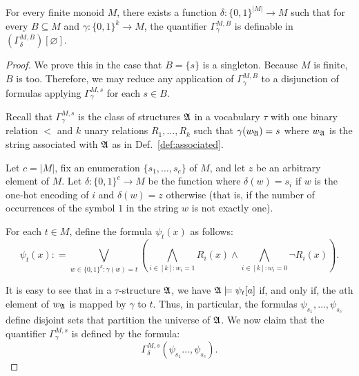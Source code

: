 \documentclass[a4paper,UKenglish,cleveref, autoref, thm-restate, anonymous]{lipics-v2021}
\begin{document}
\begin{lemma}\label{lem:finitetuple}
    For every finite monoid $M$, there exists a function $\delta : \{0,1\}^{|M|} \rightarrow M$ such that for every $B \subseteq M$ and $\gamma : \{0,1\}^k \rightarrow M$, the quantifier $\Gamma^{M,B}_{\gamma}$ is definable in $(\Gamma^{M,B}_{\delta})[\varnothing]$.
  \end{lemma}
  \begin{proof}
    We prove this in the case that $B = \{s\}$ is a singleton. Because $M$ is finite, $B$ is too. Therefore, we may reduce any application of $\Gamma^{M,B}_\gamma$ to a disjunction of formulas applying $\Gamma^{M,s}_{\gamma}$ for each $s \in B$.

    Recall that $\Gamma^{M,s}_{\gamma}$ is the class of structures $\mathfrak{A}$ in a vocabulary $\tau$ with one binary relation $<$ and $k$ unary relations $R_1,\ldots,R_k$ such that $\gamma(w_{\mathfrak{A}}) = s$ where $w_{\mathfrak{A}}$ is the string associated with $\mathfrak{A}$ as in Def.~\ref{def:associated}.

        Let $c = |M|$, fix an enumeration $\{s_1,\ldots,s_c\}$ of $M$, and let $z$ be an arbitrary element of $M$.  Let $\delta : \{0,1\}^c \rightarrow M$ be the function where $\delta(w) = s_i$ if $w$ is the one-hot encoding of $i$ and $\delta(w) = z$ otherwise (that is, if the number of occurrences of the symbol $1$ in the string $w$ is not exactly one).

        For each $t \in M$, define the formula $\psi_t(x)$ as follows:
        $$ \psi_t(x) : = \bigvee_{w \in \{0,1\}^k : \gamma(w) = t} \left( \bigwedge_{i \in [k] : w_i = 1} R_i(x) \land \bigwedge_{i \in [k] : w_i = 0} \neg R_i(x) \right).$$

          It is easy to see that in a $\tau$-structure $\mathfrak{A}$, we have $\mathfrak{A} \models \psi_t[a]$ if, and only if, the $a$th element of $w_{\mathfrak{A}}$ is mapped by $\gamma$ to $t$.  Thus, in particular, the formulas $\psi_{s_1},\ldots,\psi_{s_c}$ define disjoint sets that partition the universe of $\mathfrak{A}$.  We now claim that the quantifier $\Gamma^{M,s}_{\gamma}$ is defined by the formula:
          $$ \Gamma^{M,s}_{\delta}(\psi_{s_1}\ldots,\psi_{s_c}).$$


\end{proof}
\end{document}
